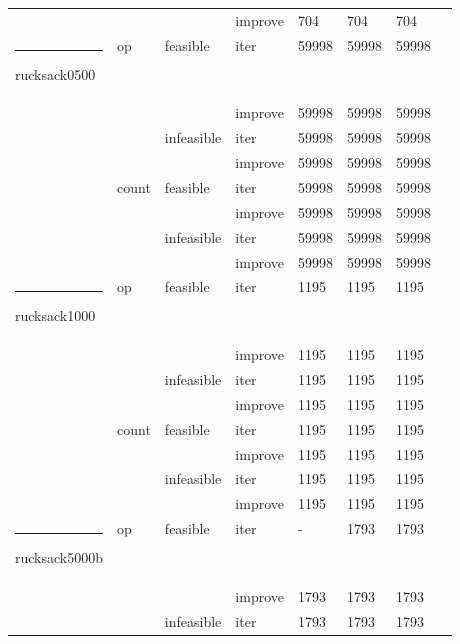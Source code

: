 \documentclass[11pt,a4paper]{article}
\makeatletter
\def\hlinewd#1{
  \noalign{\ifnum0=`}\fi\hrule \@height #1 \futurelet
  \reserved@a\@xhline
}
\makeatother
\begin{document}
\begin{table}[!t]
\begin{tabular}{ | l | l | l | l | l | l | l | l | }
                      &       &            & improve & 704  & 704 & 704 \\ \hlinewd{3pt}
        rucksack0500  & op    & feasible   & iter    & 59998 & 59998 & 59998 \\ \hline
                      &       &            & improve & 59998 & 59998 & 59998 \\ \hline
                      &       & infeasible & iter    & 59998 & 59998 & 59998 \\ \hline
                      &       &            & improve & 59998 & 59998 & 59998 \\ \hline
                      & count & feasible   & iter    & 59998 & 59998 & 59998 \\ \hline
                      &       &            & improve & 59998 & 59998 & 59998 \\ \hline
                      &       & infeasible & iter    & 59998 & 59998 & 59998 \\ \hline
                      &       &            & improve & 59998 & 59998 & 59998 \\ \hlinewd{3pt}
        rucksack1000  & op    & feasible   & iter    & 1195 & 1195 & 1195 \\ \hline
                      &       &            & improve & 1195 & 1195 & 1195 \\ \hline
                      &       & infeasible & iter    & 1195 & 1195 & 1195 \\ \hline
                      &       &            & improve & 1195 & 1195 & 1195 \\ \hline
                      & count & feasible   & iter    & 1195 & 1195 & 1195 \\ \hline
                      &       &            & improve & 1195 & 1195 & 1195 \\ \hline
                      &       & infeasible & iter    & 1195 & 1195 & 1195 \\ \hline
                      &       &            & improve & 1195 & 1195 & 1195 \\ \hlinewd{3pt}
        rucksack5000b & op    & feasible   & iter    & - & 1793 & 1793 \\ \hline
                      &       &            & improve & 1793 & 1793 & 1793 \\ \hline
                      &       & infeasible & iter    & 1793 & 1793 & 1793 \\ \hline

\end{tabular}
\end{table}
\end{document}
